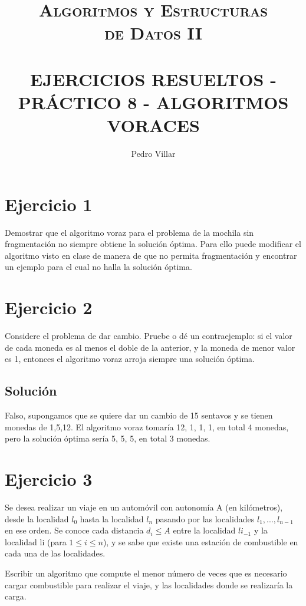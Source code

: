 \documentclass{article}
\title{ \normalsize \textsc{Algoritmos y Estructuras\\
de Datos II}
		\\ [2.0cm]
		\HRule \\
		\LARGE \textbf{\uppercase{Ejercicios Resueltos - Práctico 8 - Algoritmos Voraces}}
		\HRule \\ [0.5cm]
		\normalsize  \vspace*{5\baselineskip}}
\date{}
\author{Pedro Villar}
\begin{document}
\newcommand{\HRule}{\rule{\linewidth}{0.5pt}} %
\maketitle
\newpage
\section*{Ejercicio 1}
Demostrar que el algoritmo voraz para el problema de la mochila sin fragmentación no siempre obtiene la solución óptima. Para ello puede modificar el algoritmo visto en clase de manera de que no permita fragmentación y encontrar un ejemplo para el cual no halla la solución óptima.

\newpage
\section*{Ejercicio 2}
Considere el problema de dar cambio. Pruebe o dé un contraejemplo: si el valor de cada moneda es al menos el doble de la anterior, y la moneda de menor valor es 1, entonces el algoritmo voraz arroja siempre una solución óptima.

\subsection*{Solución}
Falso, supongamos que se quiere dar un cambio de 15 sentavos y se tienen monedas de 1,5,12. El algoritmo voraz tomaría 12, 1, 1, 1, en total 4 monedas, pero la solución óptima sería 5, 5, 5, en total 3 monedas.


\section*{Ejercicio 3}
Se desea realizar un viaje en un automóvil con autonomía A (en kilómetros), desde la localidad $l_0$ hasta la localidad $l_n$ pasando por las localidades $l_1, . . . , l_{n-1}$ en ese orden. Se conoce cada distancia $d_i\leq  A$ entre la localidad $li_{-1}$ y la localidad li (para $1 \leq i \leq n$), y se sabe que existe una estación de combustible en cada una de las localidades.

Escribir un algoritmo que compute el menor número de veces que es necesario cargar combustible para realizar el viaje, y las localidades donde se realizaría la carga.
\end{document}
